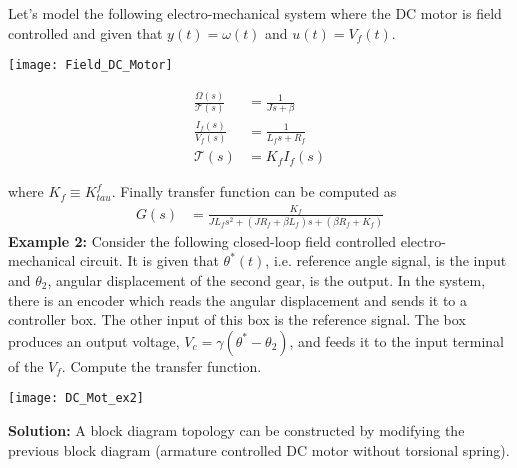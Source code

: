 \documentclass[twoside]{article}
\begin{document}
Let's model the following electro-mechanical system where the DC motor is field controlled 
and given that $y(t) = \omega(t)$ and $u(t) = V_f(t)$.

  \begin{minipage}[h]{0.65\linewidth}
    \begin{center}
      \texttt{[image: Field\_DC\_Motor]}
    \end{center}
  \end{minipage}
   \begin{minipage}[h]{0.45\linewidth}
    \begin{center}
      \begin{align*}
            \frac{\Omega(s)}{\mathcal{T}(s)} &= \frac{1}{J s + \beta}
            \\
            \frac{I_f(s)}{V_f(s)} &= \frac{1}{L_f s + R_f}
            \\
            \mathcal{T}(s) &= K_f I_f(s)
\end{align*}
    \end{center}
  \end{minipage}

where $K_f \equiv K_{tau}^f$. Finally transfer function can be computed as
\begin{align*}
            G(s) &= \frac{K_f}{ J L_f s^2 +  (J R_f + \beta L_f) s + ( \beta R_f + K_f)}
\end{align*}
     \textbf{Example 2:} Consider the following closed-loop field controlled electro-mechanical circuit. It is given that $\theta^*(t)$, i.e.
     reference angle signal, is the input and $\theta_2$, angular displacement of the second gear, is the output. In the
     system, there is an encoder which reads the angular displacement and sends it to a controller box. The other input of this box is 	the reference signal. The box produces an output voltage, $V_c = \gamma \left( \theta^* - \theta_2 \right)$, and feeds it to the 
     input terminal of the $V_f$. Compute the transfer function.
  
  
    \begin{minipage}[h]{1\linewidth}
    \begin{center}
      \texttt{[image: DC\_Mot\_ex2]}
    \end{center}
  \end{minipage} 
  
    \textbf{Solution:} A block diagram topology can be constructed by modifying the previous block diagram (armature controlled DC motor without torsional spring).
    
\end{document}
